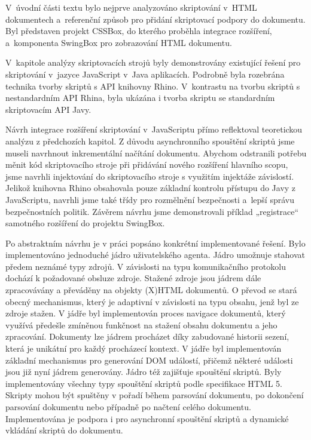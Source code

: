 V~úvodní části textu bylo nejprve analyzováno skriptování v~HTML dokumentech a~referenční způsob pro přidání skriptovací podpory do dokumentu. Byl představen projekt CSSBox, do kterého proběhla integrace rozšíření, a~komponenta SwingBox pro zobrazování HTML dokumentu.

V~kapitole analýzy skriptovacích strojů byly demonstrovány existující řešení pro skriptování v~jazyce JavaScript v~Java aplikacích. Podrobně byla rozebrána technika tvorby skriptů s API knihovny Rhino. V~kontrastu na tvorbu skriptů s nestandardním API Rhina, byla ukázána i tvorba skriptu se standardním skriptovacím API Javy.

Návrh integrace rozšíření skriptování v~JavaScriptu přímo reflektoval teoretickou analýzu z předchozích kapitol. Z důvodu asynchronního spouštění skriptů jsme museli navrhnout inkrementální načítání dokumentu. Abychom odstranili potřebu měnit kód skriptovacího stroje při přidávání nového rozšíření hlavního scopu, jsme navrhli injektování do skriptovacího stroje s využitím injektáže závislostí. Jelikož knihovna Rhino obsahovala pouze základní kontrolu přístupu do Javy z JavaScriptu, navrhli jsme také třídy pro rozmělnění bezpečnosti a~lepší správu bezpečnostních politik. Závěrem návrhu jsme demonstrovali příklad „registrace“ samotného rozšíření do projektu SwingBox.

Po abstraktním návrhu je v práci popsáno konkrétní implementované řešení. Bylo implementováno jednoduché jádro uživatelského agenta. Jádro umožnuje stahovat předem neznámé typy zdrojů. V závislosti na typu komunikačního protokolu dochází k požadované obsluze zdroje. Stažené zdroje jsou jádrem dále zpracovávány a převáděny na objekty (X)HTML dokumentů. O převod se stará obecný mechanismus, který je adaptivní v závislosti na typu obsahu, jenž byl ze zdroje stažen. V jádře byl implementován proces navigace dokumentů, který využívá předešle zmíněnou funkčnost na stažení obsahu dokumentu a jeho zpracování. Dokumenty lze jádrem procházet díky zabudované historii sezení, která je unikátní pro každý procházecí kontext. V jádře byl implementován základní mechanismus pro generování DOM událostí, přičemž některé události jsou již nyní jádrem generovány. Jádro též zajišťuje spouštění skriptů. Byly implementovány všechny typy spouštění skriptů podle specifikace HTML 5. Skripty mohou být spuštěny v pořadí během parsování dokumentu, po dokončení parsování dokumentu nebo případně po načtení celého dokumentu. Implementována je podpora i pro asynchronní spouštění skriptů a dynamické vkládání skriptů do dokumentu.

